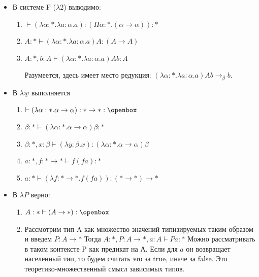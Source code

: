 \begin{itemize}
	
	\item В системе F ($\lambda 2$) выводимо:
	
	\begin{enumerate}
		\item $\vdash (\lambda \alpha : * . \lambda a : \alpha . a) : (\Pi \alpha : * . (\alpha \rightarrow \alpha)) : *$
		
		\item $A : * \vdash (\lambda \alpha : * . \lambda a : \alpha . a) A : (A \rightarrow A)$
		
		\item $A : *, b : A \vdash (\lambda \alpha : * . \lambda a : \alpha . a) A b : A$
		
		Разумеется, здесь имеет место редукция: $(\lambda \alpha : * . \lambda a : \alpha . a) A b \rightarrow_\beta b$.
	
	\end{enumerate}
	
	\item В $\lambda \underline{w}$ выполняется
	
	\begin{enumerate}
		\item $\vdash (\lambda \alpha : *. \alpha \rightarrow \alpha) : * \rightarrow * : \openbox$
		
		\item $\beta : * \vdash (\lambda \alpha : *. \alpha \rightarrow \alpha) \beta : *$
		
		\item $\beta : *, x : \beta \vdash (\lambda y : \beta . x) : (\lambda \alpha : *. \alpha \rightarrow \alpha) \beta$
		
		\item $a : *, f : * \rightarrow * \vdash f(fa) : *$
		
		\item $a : * \vdash (\lambda f : * \rightarrow * . f (f a)) : (* \rightarrow *) \rightarrow * $
	\end{enumerate}
	
	\item В $\lambda P$ верно:
	
	\begin{enumerate}
	    \item $A : * \vdash (A \rightarrow *) : \openbox$
	    
	    \item Рассмотрим тип A как множество значений типизируемых таким образом и введем $P : A \rightarrow *$
	    Тогда $A : *, P : A \rightarrow * , a : A \vdash P a : *$
	    Можно рассматривать в таком контексте P как предикат на А. Если для $a$ он возвращает населенный тип, то будем считать это за true, иначе за false. Это теоретико-множественный смысл зависимых типов.
	    

\end{enumerate}
\end{itemize}
